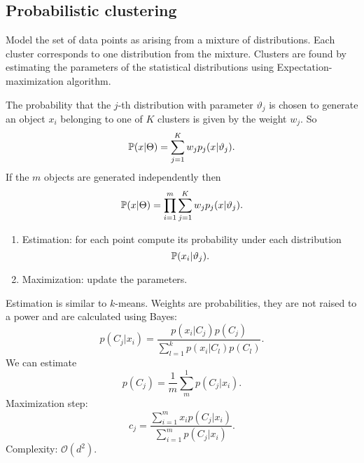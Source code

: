 \documentclass[a4paper,9pt]{extarticle}
\begin{document}
\begin{multicols*}{2}
\section{Probabilistic clustering}
Model the set of data points as arising from a mixture of distributions. Each cluster corresponds to one distribution from the mixture. Clusters are found by estimating the parameters of the statistical distributions using Expectation-maximization algorithm.\par
The probability that the $j$-th distribution with parameter $\vartheta_{j}$ is chosen to generate an object $x_{i}$ belonging to one of $K$ clusters is given by the weight $w_{j}$. So
\begin{equation*}
	\mathbb{P}(x|\Theta)=\sum_{j=1}^{K}w_{j}p_{j}(x|\vartheta_{j}).
\end{equation*}
If the $m$ objects are generated independently then
\begin{equation*}
	\mathbb{P}(x|\Theta)=\prod_{i=1}^{m}\sum_{j=1}^{K}w_{j}p_{j}(x|\vartheta_{j}).
\end{equation*}
\begin{riquadro}
	\begin{enumerate}
		\item Estimation: for each point compute its probability under each distribution 
		\begin{equation*}
			\mathbb{P}(x_{i}|\vartheta_{j}).
		\end{equation*}
		\item Maximization: update the parameters.
	\end{enumerate}
\end{riquadro}
Estimation is similar to $k$-means. Weights are probabilities, they are not raised to a power and are calculated using Bayes:
\begin{equation*}
	p(C_{j}|x_{i})=\frac{p(x_{i}|C_{j})p(C_{j})}{\sum_{l=1}^{k}p(x_{i}|C_{l})p(C_{l})}.
\end{equation*}
We can estimate
\begin{equation*}
	p(C_{j})=\frac{1}{m}\sum_{m}^{1}p(C_{j}|x_{i}).
\end{equation*}
Maximization step:
\begin{equation*}
	c_{j}=\frac{\sum_{i=1}^{m}x_{i}p(C_{j}|x_{i})}{\sum_{i=1}^{m}p(C_{j}|x_{i})}.
\end{equation*}
Complexity: $\mathcal{O}(d^{2})$.

\end{multicols*}
\end{document}
